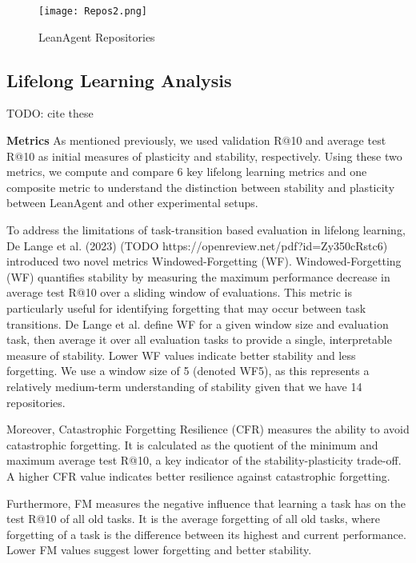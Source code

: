 \documentclass{article} %
\begin{document}
\begin{figure}
        \centering
        \texttt{[image: Repos2.png]}
        \caption{LeanAgent Repositories}
        \label{fig:repos}
    \end{figure}


\subsection{Lifelong Learning Analysis}

TODO: cite these

\textbf{Metrics} As mentioned previously, we used validation R@10 and average test R@10 as initial measures of plasticity and stability, respectively. Using these two metrics, we compute and compare 6 key lifelong learning metrics and one composite metric to understand the distinction between stability and plasticity between LeanAgent and other experimental setups.

To address the limitations of task-transition based evaluation in lifelong learning, De Lange et al. (2023) (TODO https://openreview.net/pdf?id=Zy350cRstc6) introduced two novel metrics Windowed-Forgetting (WF). Windowed-Forgetting (WF) quantifies stability by measuring the maximum performance decrease in average test R@10 over a sliding window of evaluations. This metric is particularly useful for identifying forgetting that may occur between task transitions. De Lange et al. define WF for a given window size and evaluation task, then average it over all evaluation tasks to provide a single, interpretable measure of stability. Lower WF values indicate better stability and less forgetting. We use a window size of 5 (denoted WF5), as this represents a relatively medium-term understanding of stability given that we have 14 repositories.

Moreover, Catastrophic Forgetting Resilience (CFR) measures the ability to avoid catastrophic forgetting. It is calculated as the quotient of the minimum and maximum average test R@10, a key indicator of the stability-plasticity trade-off. A higher CFR value indicates better resilience against catastrophic forgetting.

Furthermore, FM measures the negative influence that learning a task has on the test R@10 of all old tasks. It is the average forgetting of all old tasks, where forgetting of a task is the difference between its highest and current performance. Lower FM values suggest lower forgetting and better stability.
\end{document}
